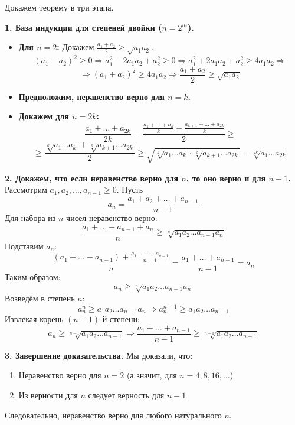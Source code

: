 \begin{tcolorbox}[title=Доказательство по ММИ (метод Коши / метод обратой индукции), breakable]
Докажем теорему в три этапа.

\textbf{1. База индукции для степеней двойки ($n=2^m$).}
\begin{itemize}
    \item \textbf{Для $n=2$:} Докажем $\frac{a_1 + a_2}{2} \geq \sqrt{a_1 a_2}$.
    $$(a_1 - a_2)^2 \geq 0 \Rightarrow a_1^2 - 2a_1a_2 + a_2^2 \geq 0 \Rightarrow a_1^2 + 2a_1a_2 + a_2^2 \geq 4a_1a_2 \Rightarrow$$
    $$\Rightarrow (a_1 + a_2)^2 \geq 4a_1a_2 \Rightarrow \frac{a_1 + a_2}{2} \geq \sqrt{a_1 a_2}$$
    \item \textbf{Предположим, неравенство верно для $n = k$.}
    \item \textbf{Докажем для $n = 2k$:}
    $$\frac{a_1 + \dots + a_{2k}}{2k} = \frac{\frac{a_1 + \dots + a_k}{k} + \frac{a_{k+1} + \dots + a_{2k}}{k}}{2} \geq$$
    $$\geq \frac{\sqrt[k]{a_1 \dots a_k} + \sqrt[k]{a_{k+1} \dots a_{2k}}}{2} \geq \sqrt{\sqrt[k]{a_1 \dots a_k} \cdot \sqrt[k]{a_{k+1} \dots a_{2k}}} = \sqrt[2k]{a_1 \dots a_{2k}}$$
\end{itemize}

\textbf{2. Докажем, что если неравенство верно для $n$, то оно верно и для $n-1$.}
Рассмотрим $a_1, a_2, \dots, a_{n-1} \geq 0$. Пусть
$$a_n = \frac{a_1 + a_2 + \dots + a_{n-1}}{n-1}$$
Для набора из $n$ чисел неравенство верно:
$$\frac{a_1 + \dots + a_{n-1} + a_n}{n} \geq \sqrt[n]{a_1 a_2 \dots a_{n-1} a_n}$$
Подставим $a_n$:
$$\frac{(a_1 + \dots + a_{n-1}) + \frac{a_1 + \dots + a_{n-1}}{n-1}}{n} = \frac{a_1 + \dots + a_{n-1}}{n-1} = a_n$$
Таким образом:
$$a_n \geq \sqrt[n]{a_1 a_2 \dots a_{n-1} a_n}$$
Возведём в степень $n$:
$$a_n^n \geq a_1 a_2 \dots a_{n-1} a_n \Rightarrow a_n^{n-1} \geq a_1 a_2 \dots a_{n-1}$$
Извлекая корень $(n-1)$-й степени:
$$a_n \geq \sqrt[n-1]{a_1 a_2 \dots a_{n-1}} \Rightarrow \frac{a_1 + \dots + a_{n-1}}{n-1} \geq \sqrt[n-1]{a_1 a_2 \dots a_{n-1}}$$

\textbf{3. Завершение доказательства.}
Мы доказали, что:
\begin{enumerate}
    \item Неравенство верно для $n=2$ (а значит, для $n=4,8,16,\dots$)
    \item Из верности для $n$ следует верность для $n-1$
\end{enumerate}
Следовательно, неравенство верно для любого натурального $n$.
\end{tcolorbox}
